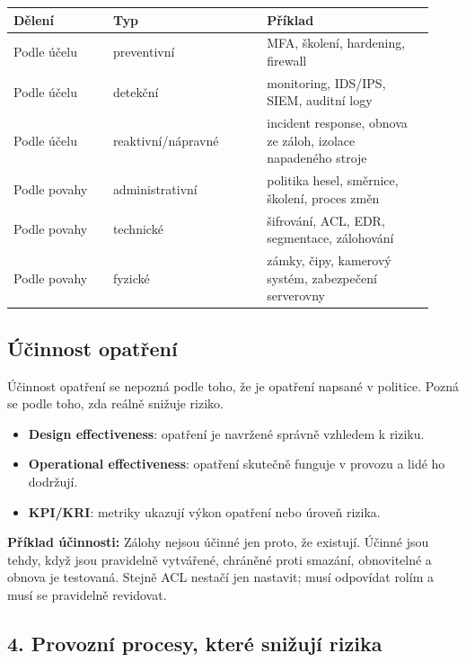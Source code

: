\documentclass[11pt,a4paper]{article}
\newcommand{\itpr}[1]{\medskip\noindent\colorbox{green!8}{\parbox{\dimexpr\linewidth-2\fboxsep}{#1}}\medskip}
\begin{document}
\begin{longtable}{p{0.22\linewidth}p{0.34\linewidth}p{0.37\linewidth}}
\toprule
\textbf{Dělení} & \textbf{Typ} & \textbf{Příklad} \\
\midrule\endhead
Podle účelu & preventivní & MFA, školení, hardening, firewall \\
Podle účelu & detekční & monitoring, IDS/IPS, SIEM, auditní logy \\
Podle účelu & reaktivní/nápravné & incident response, obnova ze záloh, izolace napadeného stroje \\
\addlinespace
Podle povahy & administrativní & politika hesel, směrnice, školení, proces změn \\
Podle povahy & technické & šifrování, ACL, EDR, segmentace, zálohování \\
Podle povahy & fyzické & zámky, čipy, kamerový systém, zabezpečení serverovny \\
\bottomrule
\end{longtable}

\subsection*{Účinnost opatření}

Účinnost opatření se nepozná podle toho, že je opatření napsané v politice. Pozná se podle toho, zda reálně snižuje riziko.

\begin{itemize}
    \item \textbf{Design effectiveness}: opatření je navržené správně vzhledem k riziku.
    \item \textbf{Operational effectiveness}: opatření skutečně funguje v provozu a lidé ho dodržují.
    \item \textbf{KPI/KRI}: metriky ukazují výkon opatření nebo úroveň rizika.
\end{itemize}

\itpr{\textbf{Příklad účinnosti:} Zálohy nejsou účinné jen proto, že existují. Účinné jsou tehdy, když jsou pravidelně vytvářené, chráněné proti smazání, obnovitelné a obnova je testovaná. Stejně ACL nestačí jen nastavit; musí odpovídat rolím a musí se pravidelně revidovat.}

\subsection*{4. Provozní procesy, které snižují rizika}
\end{document}
